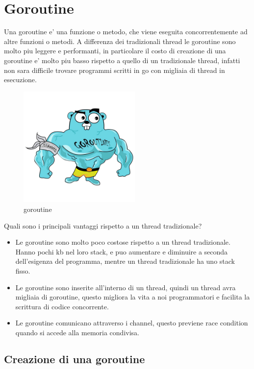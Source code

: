 \section{Goroutine}
Una goroutine e' una funzione o metodo, che viene eseguita concorrentemente ad altre funzioni o metodi. \newline
A differenza dei tradizionali thread le goroutine sono molto piu leggere e performanti, in particolare il costo di creazione di una goroutine e' molto piu basso rispetto a quello di un tradizionale thread, infatti non sara difficile trovare programmi scritti in go con migliaia di thread in esecuzione.

\begin{figure}[h!]
    \centering
    \includegraphics[width=6cm]{sections/goroutine.jpeg}
    \caption{goroutine}
    \label{fig:my_label}
\end{figure}

Quali sono i principali vantaggi rispetto a un thread tradizionale?

\begin{itemize}
    \item Le goroutine sono molto poco costose rispetto a un thread tradizionale. Hanno pochi kb nel loro stack, e puo aumentare e diminuire a seconda dell'esigenza del programma, mentre un thread tradizionale ha uno stack fisso.
    \item Le goroutine sono inserite all'interno di un thread, quindi un thread avra migliaia di goroutine, questo migliora la vita a noi programmatori e facilita la scrittura di codice concorrente.
    \item Le goroutine comunicano attraverso i channel, questo previene race condition quando si accede alla memoria condivisa.
\end{itemize}

\newpage
\subsection{Creazione di una goroutine}

